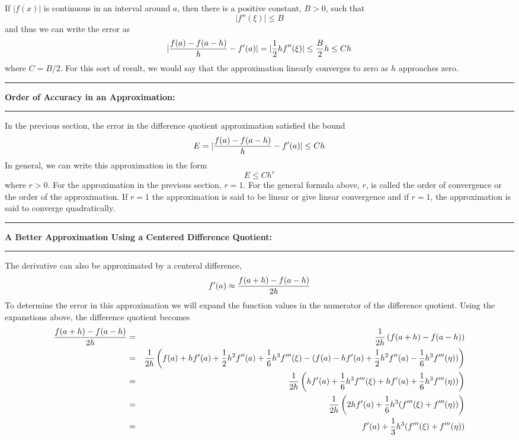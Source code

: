 \documentclass[10pt,fleqn]{article}
\begin{document}
If \(|f(x)|\) is continuous in an interval around \(a\), then there is a
positive constant, \(B>0\), such that
\[
  |f''(\xi)| \leq B
\]
and thus we can write the error as
\[
  | {{f(a)-f(a-h)}\over{h}} - f'(a) | = | {1\over 2} h f''(\xi) |
         \leq {B\over 2} h \leq Ch
\]
where \(C=B/2\). For this sort of result, we would say that the approximation
linearly converges to zero as \(h\) approaches zero.
\vskip0.1in\hrule\vskip0.1in\noindent
{\bf Order of Accuracy in an Approximation:} 
\vskip0.1in\hrule\vskip0.1in\noindent
In the previous section, the error in the difference quotient approximation
satisfied the bound
\[
  E = | {{f(a)-f(a-h)}\over{h}} - f'(a) | \leq C h 
\]
In general, we can write this approximation in the form
\[
  E \leq C h^r
\]
where \(r>0\). For the approximation in the previous section, \(r=1\). For the
general formula above, \(r\), is called the order of convergence or the order of
the approximation. If \(r=1\) the approximation is said to be linear or give
linear convergence and if \(r=1\), the approximation is said to converge
quadratically.
\vskip0.1in\hrule\vskip0.1in\noindent
{\bf A Better Approximation Using a Centered Difference Quotient:} 
\vskip0.1in\hrule\vskip0.1in\noindent
The derivative can also be approximated by a centeral difference,
\[
  f'(a) \approx {{f(a+h)-f(a-h)}\over{2h}}
\]
To determine the error in this approximation we will expand the function values
in the numerator of the difference quotient. Using the expanstions above, the
difference quotient becomes
\begin{eqnarray*}
  {{f(a+h)-f(a-h)}\over{2h}}
     & = & {1\over{2h}} \left( f(a+h) - f(a-h) \right) \\
     & = & {1\over{2h}}
       \left(
         f(a) + h f'(a) + {1\over 2} h^2 f''(a) + {1\over 6} h^3 f'''(\xi)
        - ( f(a) - h f'(a) + {1\over 2} h^2 f''(a) - {1\over 6} h^3 f'''(\eta))
       \right) \\
     & = & {1\over{2h}}
       \left(
         h f'(a) + {1\over 6} h^3 f'''(\xi)
       + h f'(a) + {1\over 6} h^3 f'''(\eta))
       \right) \\
     & = & {1\over{2h}}
       \left(
         2 h f'(a) + {1\over 6} h^3 ( f'''(\xi) + f'''(\eta) )
       \right) \\
     & = & f'(a) + {1\over 3} h^3 ( f'''(\xi) + f'''(\eta) )
\end{eqnarray*}
\end{document}
